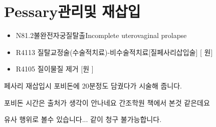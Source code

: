 \section{Pessary관리및 재삽입}
\begin{paracol}{2}
\setlength{\columnseprule}{0.4pt}
\setlength{\columnsep}{2em}
\begin{leftcolumn}
\begin{commentbox}{}
\begin{itemize}\tightlist
\item[\dsjuridical] N81.2불완전자궁질탈출Incomplete uterovaginal prolapse
\item[\dsmedical] R4113 질탈교정술(수술적치료)-비수술적치료[질페사리삽입술] [ 원] 
\item[\dsmedical] R4105 질이물질 제거 [원 ]
\end{itemize}
\end{commentbox}
\end{leftcolumn}

\begin{rightcolumn}
페사리 재삽입시 포비돈에 20분정도 담궜다가 시술해 줍니다.\par
포비돈 시간은 출처가 생각이 안나네요 간조학원 책에서 본것 같은데요
\end{rightcolumn}
\end{paracol}

유사 행위로 볼수 있습니다... 같이 청구 불가능합니다.